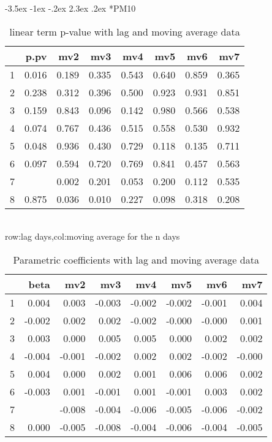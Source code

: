 \documentclass[a4paper, 12pt]{article}
\makeatletter
\def\large{\fontsize{14}{20}\selectfont}
\renewcommand\subsection{\@startsection {subsection}{1}{\z@}%
                                   {-3.5ex \@plus -1ex \@minus -.2ex}%
                                   {2.3ex \@plus.2ex}%
                                   {\centering\normalfont\large\bfseries}}
\makeatother
\begin{document}
\subsection*{PM10}
\begin{table}[h]
\centering
\caption{linear term p-value with lag and moving average data}
\begin{tabular}{rrrrrrrr}
  \hline
 & p.pv & mv2 & mv3 & mv4 & mv5 & mv6 & mv7 \\
  \hline
1 & 0.016 & 0.189 & 0.335 & 0.543 & 0.640 & 0.859 & 0.365 \\
  2 & 0.238 & 0.312 & 0.396 & 0.500 & 0.923 & 0.931 & 0.851 \\
  3 & 0.159 & 0.843 & 0.096 & 0.142 & 0.980 & 0.566 & 0.538 \\
  4 & 0.074 & 0.767 & 0.436 & 0.515 & 0.558 & 0.530 & 0.932 \\
  5 & 0.048 & 0.936 & 0.430 & 0.729 & 0.118 & 0.135 & 0.711 \\
  6 & 0.097 & 0.594 & 0.720 & 0.769 & 0.841 & 0.457 & 0.563 \\
  7 & \color{red}{0.001} & 0.002 & 0.201 & 0.053 & 0.200 & 0.112 & 0.535 \\
  8 & 0.875 & 0.036 & 0.010 & 0.227 & 0.098 & 0.318 & 0.208 \\
   \hline
\end{tabular}
\\row:lag days,col:moving average for the n days
\end{table}

\begin{table}[h]
\centering
\caption{Parametric coefficients with lag and moving average data}
\begin{tabular}{rrrrrrrr}
  \hline
 & beta & mv2 & mv3 & mv4 & mv5 & mv6 & mv7 \\
  \hline
1 & 0.004 & 0.003 & -0.003 & -0.002 & -0.002 & -0.001 & 0.004 \\
  2 & -0.002 & 0.002 & 0.002 & -0.002 & -0.000 & -0.000 & 0.001 \\
  3 & 0.003 & 0.000 & 0.005 & 0.005 & 0.000 & 0.002 & 0.002 \\
  4 & -0.004 & -0.001 & -0.002 & 0.002 & 0.002 & -0.002 & -0.000 \\
  5 & 0.004 & 0.000 & 0.002 & 0.001 & 0.006 & 0.006 & 0.002 \\
  6 & -0.003 & 0.001 & -0.001 & 0.001 & -0.001 & 0.003 & 0.002 \\
  7 & \color{red}{-0.007} & -0.008 & -0.004 & -0.006 & -0.005 & -0.006 & -0.002 \\
  8 & 0.000 & -0.005 & -0.008 & -0.004 & -0.006 & -0.004 & -0.005 \\
   \hline
\end{tabular}
\end{table}
\clearpage
\end{document}
